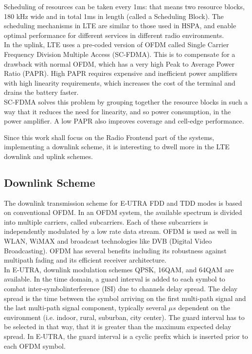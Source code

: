 Scheduling of resources can be taken every 1ms: that means two resource blocks,
180 kHz wide and in total 1ms in length (called a Scheduling Block). The scheduling
mechanisms in LTE are similar to those used in HSPA, and enable optimal performance
for different services in different radio environments.\\

In the uplink, LTE uses a pre-coded version of OFDM called Single Carrier Frequency
Division Multiple Access (SC-FDMA). This is to compensate for a drawback with normal
OFDM, which has a very high Peak to Average Power Ratio (PAPR). High PAPR requires
expensive and inefficient power amplifiers with high linearity requirements, which
increases the cost of the terminal and drains the battery faster.\\

SC-FDMA solves this problem by grouping together the resource blocks in such a
way that it reduces the need for linearity, and so power consumption, in the
power amplifier. A low PAPR also improves coverage and cell-edge performance.

Since this work shall focus on the Radio Frontend part of the systems, implementing
a downlink scheme, it is interesting to dwell more in the LTE downlink and uplink
schemes.

\subsection{Downlink Scheme}%

The downlink transmission scheme for E-UTRA FDD and TDD modes is based on
conventional OFDM. In an OFDM system, the available spectrum is divided into
multiple carriers, called subcarriers. Each of these subcarriers is
independently modulated by a low rate data stream. OFDM is used as well in WLAN,
WiMAX and broadcast technologies like DVB (Digital Video Broadcasting). OFDM has
several benefits including its robustness against multipath fading and its
efficient receiver architecture.\\

In E-UTRA, downlink modulation schemes QPSK, 16QAM, and 64QAM are available.
In the time domain, a guard interval is added to each symbol to combat
inter-symbolinterference (ISI) due to channels delay spread. The delay spread is
the time between the symbol arriving on the first multi-path signal and the last
multi-path signal component, typically several $\mu s$ dependent on the environment
(i.e. indoor, rural, suburban, city center). The guard interval has to be selected
in that way, that it is greater than the maximum expected delay spread. In E-UTRA,
the guard interval is a cyclic prefix which is inserted prior to each OFDM symbol.\\

